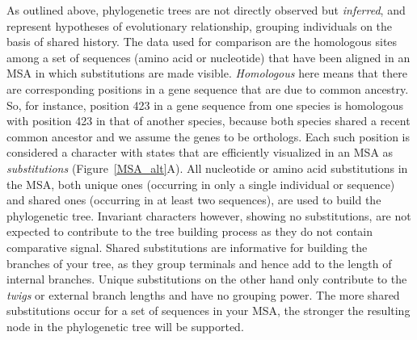 As outlined above, phylogenetic trees are not directly observed but \textit{inferred}, and represent hypotheses of evolutionary relationship, grouping individuals on the basis of shared history.
The data used for comparison are the homologous sites among a set of sequences (amino acid or nucleotide) that have been aligned in an MSA in which substitutions are made visible.
\textit{Homologous} here means that there are corresponding positions in a gene sequence that are due to common ancestry.
So, for instance, position 423 in a gene sequence from one species is homologous with position 423 in that of another species, because both species shared a recent common ancestor and we assume the genes to be orthologs.
Each such position is considered a character with states that are efficiently visualized in an MSA as \textit{substitutions} (Figure~\ref{MSA_alt}A).
All nucleotide or amino acid substitutions in the MSA, both unique ones (occurring in only a single individual or sequence) and shared ones (occurring in at least two sequences), are used to build the phylogenetic tree.
Invariant characters however, showing no substitutions, are not expected to contribute to the tree building process as they do not contain comparative signal.
Shared substitutions are informative for building the branches of your tree, as they group terminals and hence add to the length of internal branches.
Unique substitutions on the other hand only contribute to the \textit{twigs} or external branch lengths and have no grouping power.
The more shared substitutions occur for a set of sequences in your MSA, the stronger the resulting node in the phylogenetic tree will be supported.

